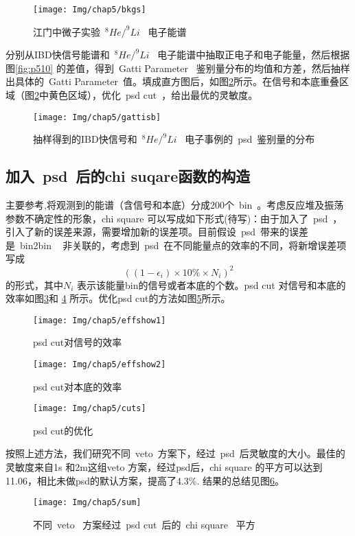 \begin{figure}[!htbp]
  \centering
   \texttt{[image: Img/chap5/bkgs]}
    \caption{江门中微子实验~$^{8}He/^{9}Li$~ 电子能谱}
  \label{fig:p514}
\end{figure}
分别从IBD快信号能谱和~$^{8}He/^{9}Li$~ 电子能谱中抽取正电子和电子能量，然后根据图\ref{fig:p510} 的差值，得到~Gatti Parameter~ 鉴别量分布的均值和方差，然后抽样出具体的~Gatti Parameter~值。填成直方图后，如图\ref{fig:p515}所示。在信号和本底重叠区域（图\ref{fig:p515}中黄色区域），优化~psd cut~，给出最优的灵敏度。
\begin{figure}[!htbp]
  \centering
   \texttt{[image: Img/chap5/gattisb]}
    \caption{抽样得到的IBD快信号和~$^{8}He/^{9}Li$~ 电子事例的~psd~鉴别量的分布}
  \label{fig:p515}
\end{figure}
\subsection{加入~psd~后的chi suqare函数的构造}
主要参考\citep{li2013unambiguous},将观测到的能谱（含信号和本底）分成200个~bin~。考虑反应堆及振荡参数不确定性的形象，chi square 可以写成如下形式(待写)：由于加入了~psd~，引入了新的误差来源，需要增加新的误差项。目前假设~psd~带来的误差是~bin2bin ~ 非关联的，考虑到~psd~在不同能量点的效率的不同，将新增误差项写成$${\left((1-\epsilon_{i})\times{10\%}\times{N_{i}}\right)}^{2}$$的形式，其中$N_{i}$ 表示该能量bin的信号或者本底的个数。psd cut 对信号和本底的效率如图\ref{fig:p516}和 \ref{fig:p517} 所示。优化psd cut的方法如图\ref{fig:p518}所示。
\begin{figure}[!htbp]
  \centering
   \texttt{[image: Img/chap5/effshow1]}
    \caption{psd cut对信号的效率}
  \label{fig:p516}
\end{figure}
\begin{figure}[!htbp]
  \centering
   \texttt{[image: Img/chap5/effshow2]}
    \caption{psd cut对本底的效率}
  \label{fig:p517}
\end{figure}
\begin{figure}[!htbp]
  \centering
   \texttt{[image: Img/chap5/cuts]}
    \caption{psd cut的优化}
  \label{fig:p518}
\end{figure}
按照上述方法，我们研究不同~veto~方案下，经过~psd~后灵敏度的大小。最佳的灵敏度来自1s 和2m这组veto 方案，经过psd后，chi square 的平方可以达到11.06，相比未做psd的默认方案，提高了4.3\%. 结果的总结见图\ref{fig:p519}。
\begin{figure}[!htbp]
  \centering
   \texttt{[image: Img/chap5/sum]}
    \caption{不同~veto~ 方案经过~psd cut~后的~chi square ~平方}
  \label{fig:p519}
\end{figure}
